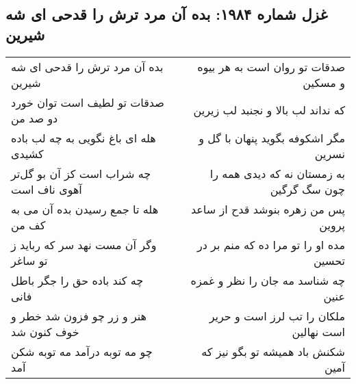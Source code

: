 \begin{center}
\section*{غزل شماره ۱۹۸۴: بده آن مرد ترش را قدحی ای شه شیرین}
\label{sec:1984}
\begin{longtable}{l p{0.5cm} r}
بده آن مرد ترش را قدحی ای شه شیرین
&&
صدقات تو روان است به هر بیوه و مسکین
\\
صدقات تو لطیف است توان خورد دو صد من
&&
که نداند لب بالا و نجنبد لب زیرین
\\
هله ای باغ نگویی به چه لب باده کشیدی
&&
مگر اشکوفه بگوید پنهان با گل و نسرین
\\
چه شراب است کز آن بو گل‌تر آهوی ناف است
&&
به زمستان نه که دیدی همه را چون سگ گرگین
\\
هله تا جمع رسیدن بده آن می به کف من
&&
پس من زهره بنوشد قدح از ساعد پروین
\\
وگر آن مست نهد سر که رباید ز تو ساغر
&&
مده او را تو مرا ده که منم بر در تحسین
\\
چه کند باده حق را جگر باطل فانی
&&
چه شناسد مه جان را نظر و غمزه عنین
\\
هنر و زر چو فزون شد خطر و خوف کنون شد
&&
ملکان را تب لرز است و حریر است نهالین
\\
چو مه توبه درآمد مه توبه شکن آمد
&&
شکنش باد همیشه تو بگو نیز که آمین
\\
\end{longtable}
\end{center}
